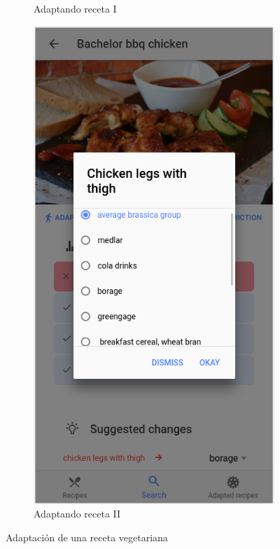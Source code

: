 \begin{figure}[H]
\begin{subfigure}[b]{0.31\linewidth}
        \caption{Adaptando receta I}
        \label{fig:ejemplo14}
    \end{subfigure}
    \begin{subfigure}[b]{0.31\linewidth}
        \includegraphics[width=\linewidth]{imagenes/app/pantallas/ejemplo15.png}
        \caption{Adaptando receta II}
        \label{fig:ejemplo15}
    \end{subfigure}
    \caption{Adaptación de una receta vegetariana}
    \label{fig:seleccion2}
\end{figure}

